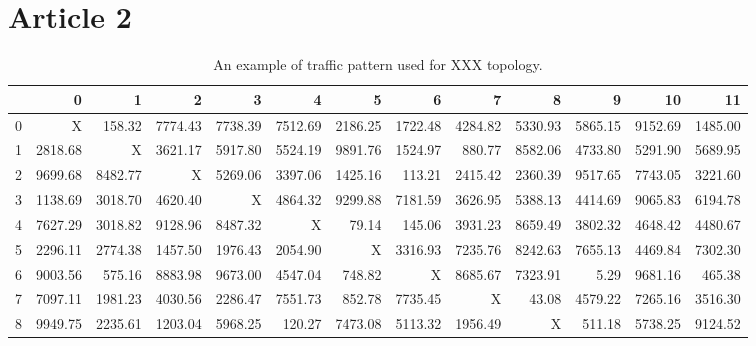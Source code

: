 \chapter{Article 2} 
\lipsum 

\cite{rfc6462,rfc6463,rfc6468,rfc6470,rfc6471,rfc6475}

\begin{table}
	\scriptsize
	\centering
	\caption{An example of traffic pattern used for XXX topology.}
	\begin{tabular}{c|rrrrrrrrrrrr}
		{} &       0  &       1  &       2  &       3  &       4  &       5  &       6  &       7  &       8  &       9  &       10 &       11 \\
		\hline
		0  &      X &   158.32 &  7774.43 &  7738.39 &  7512.69 &  2186.25 &  1722.48 &  4284.82 &  5330.93 &  5865.15 &  9152.69 &  1485.00 \\
		1  &  2818.68 &      X &  3621.17 &  5917.80 &  5524.19 &  9891.76 &  1524.97 &   880.77 &  8582.06 &  4733.80 &  5291.90 &  5689.95 \\
		2  &  9699.68 &  8482.77 &      X &  5269.06 &  3397.06 &  1425.16 &   113.21 &  2415.42 &  2360.39 &  9517.65 &  7743.05 &  3221.60 \\
		3  &  1138.69 &  3018.70 &  4620.40 &      X &  4864.32 &  9299.88 &  7181.59 &  3626.95 &  5388.13 &  4414.69 &  9065.83 &  6194.78 \\
		4  &  7627.29 &  3018.82 &  9128.96 &  8487.32 &      X &    79.14 &   145.06 &  3931.23 &  8659.49 &  3802.32 &  4648.42 &  4480.67 \\
		5  &  2296.11 &  2774.38 &  1457.50 &  1976.43 &  2054.90 &      X &  3316.93 &  7235.76 &  8242.63 &  7655.13 &  4469.84 &  7302.30 \\
		6  &  9003.56 &   575.16 &  8883.98 &  9673.00 &  4547.04 &   748.82 &      X &  8685.67 &  7323.91 &     5.29 &  9681.16 &   465.38 \\
		7  &  7097.11 &  1981.23 &  4030.56 &  2286.47 &  7551.73 &   852.78 &  7735.45 &      X &    43.08 &  4579.22 &  7265.16 &  3516.30 \\
		8  &  9949.75 &  2235.61 &  1203.04 &  5968.25 &   120.27 &  7473.08 &  5113.32 &  1956.49 &      X &   511.18 &  5738.25 &  9124.52 \\

\end{tabular}
\end{table}
